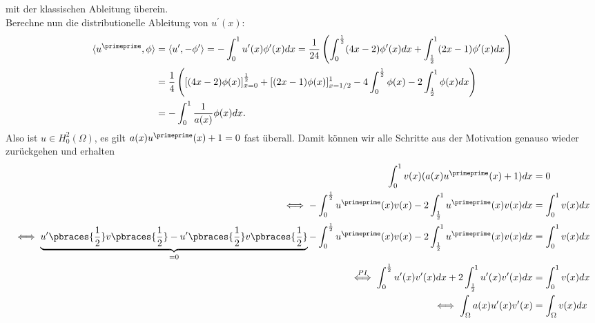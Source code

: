 \begin{solution}
mit der klassischen Ableitung überein. \\
Berechne nun die distributionelle Ableitung von $u^{\prime}(x)$:
\begin{align*}
  \langle u^{\primeprime}, \phi \rangle &= \langle u^{\prime}, -\phi^{\prime}\rangle
  = -\int_0^1 u^{\prime}(x)\phi^{\prime}(x) dx =
  \frac{1}{24}\left(\int_0^{\frac{1}{2}}(4x-2)\phi^{\prime}(x) dx +
  \int_{\frac{1}{2}}^1(2x-1)\phi^{\prime}(x) dx\right) \\
  &= \frac{1}{4}\left([(4x-2)\phi(x)]_{x=0}^{\frac{1}{2}} + [(2x-1)\phi(x)]_{x=1/2}^{1} -
  4\int_0^{\frac{1}{2}}\phi(x) - 2\int_{\frac{1}{2}}^1\phi(x)dx\right) \\
  &= -\int_0^1 \frac{1}{a(x)}\phi(x) dx.
\end{align*}
Also ist $u \in H_0^2(\Omega)$, es gilt $a(x)u^{\primeprime}(x) + 1 = 0$
fast überall. Damit können wir alle Schritte aus der Motivation genauso wieder
zurückgehen und erhalten
\begin{align*}
  \int_0^1 v(x)(a(x)u^{\primeprime}(x) + 1) dx &= 0 \\
  \iff - \int_0^{\frac{1}{2}}u^{\primeprime}(x)v(x) -2\int_{\frac{1}{2}}^1 u^{\primeprime}(x)v(x) dx
  &= \int_0^1 v(x) dx \\
   \iff \underbrace{u^{\prime}\pbraces{\frac{1}{2}}v\pbraces{\frac{1}{2}} - u^{\prime}\pbraces{\frac{1}{2}}v\pbraces{\frac{1}{2}}}_{=0} - \int_0^{\frac{1}{2}}u^{\primeprime}(x)v(x)
  -2 \int_{\frac{1}{2}}^1 u^{\primeprime}(x)v(x) dx  &=
  \int_0^1 v(x) dx \\
  \stackrel{PI}{\iff} \int_0^{\frac{1}{2}} u^{\prime}(x)v^{\prime}(x)dx +
  2\int_{\frac{1}{2}}^1 u^{\prime}(x)v^{\prime}(x) dx &= \int_0^1 v(x) dx \\
  \iff \int_\Omega a(x)u^{\prime}(x)v^{\prime}(x) &= \int_\Omega v(x) dx
\end{align*}
\end{solution}


